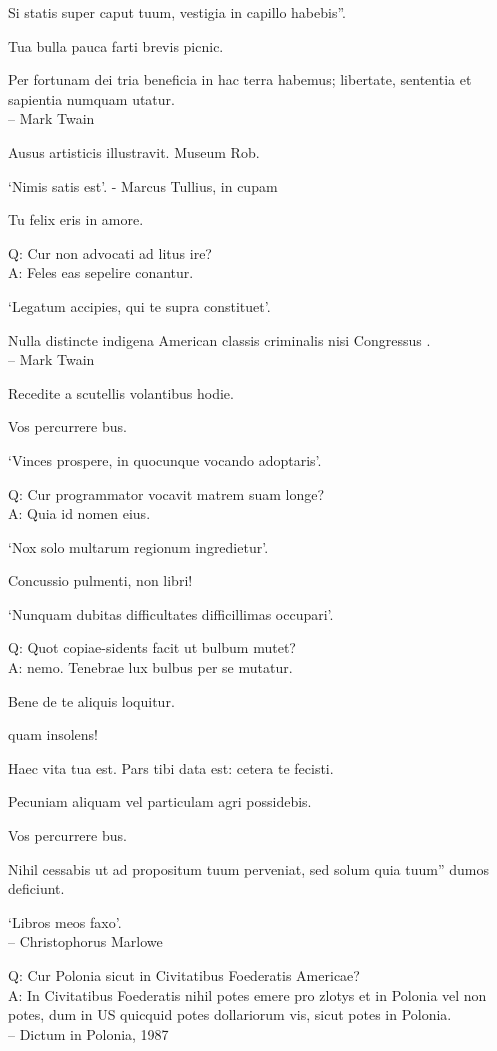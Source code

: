 \documentclass[titlepage,12pt]{memoir}
\begin{document}
Si statis super caput tuum, vestigia in capillo habebis”.

Tua bulla pauca farti brevis picnic.

Per fortunam dei tria beneficia in hac terra habemus;
libertate, sententia et sapientia numquam utatur.
\\-- Mark Twain

Ausus artisticis illustravit. Museum Rob.

‘Nimis satis est’.
- Marcus Tullius, in cupam

Tu felix eris in amore.

Q: Cur non advocati ad litus ire?\\
A: Feles eas sepelire conantur.

‘Legatum accipies, qui te supra constituet’.

Nulla distincte indigena American classis criminalis nisi Congressus .
\\-- Mark Twain

Recedite a scutellis volantibus hodie.

Vos percurrere bus.

‘Vinces prospere, in quocunque vocando adoptaris’.

Q: Cur programmator vocavit matrem suam longe?\\
A: Quia id nomen eius.

‘Nox solo multarum regionum ingredietur’.

Concussio pulmenti, non libri!

‘Nunquam dubitas difficultates difficillimas occupari’.

Q: Quot copiae-sidents facit ut bulbum mutet?\\
A: nemo. Tenebrae lux bulbus per se mutatur.

 Bene de te aliquis loquitur.

quam insolens!

Haec vita tua est. Pars tibi data est: cetera te fecisti.

 Pecuniam aliquam vel particulam agri possidebis.

Vos percurrere bus.

Nihil cessabis ut ad propositum tuum perveniat, sed solum quia tuum”
dumos deficiunt.

‘Libros meos faxo’.
\\-- Christophorus Marlowe

Q: Cur Polonia sicut in Civitatibus Foederatis Americae?\\
A: In Civitatibus Foederatis nihil potes emere pro zlotys et in
Polonia vel non potes, dum in US quicquid potes
dollariorum vis, sicut potes in Polonia.
\\-- Dictum in Polonia, 1987
\end{document}
